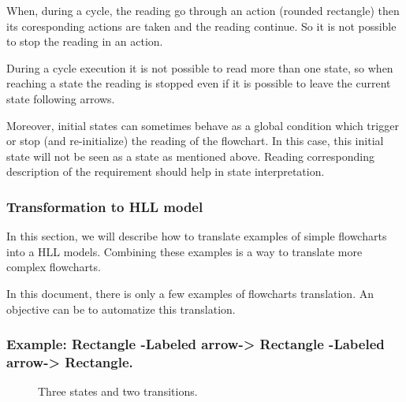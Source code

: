 When, during a cycle, the reading go through an action (rounded
rectangle) then its coresponding actions are taken and the reading
continue. So it is not possible to stop the reading in an action. 

During a cycle execution it is not possible to read more than one
state, so when reaching a state the reading is stopped even if it is
possible to leave the current state following arrows. 

Moreover, initial states can sometimes behave as a global condition
which trigger or stop (and re-initialize) the reading of the
flowchart. In this case, this initial state will not be seen as a
state as mentioned above. Reading corresponding description of the
requirement should help in state interpretation. 


\subsubsection{Transformation to HLL model}
\label{transformation-to-hll-program}
In this section, we will describe how to translate examples of simple
flowcharts into a HLL models. Combining these examples is a way to
translate more complex flowcharts.

In this document, there is only a few examples of flowcharts
translation. An objective can be to automatize this translation.


\subsubsection{Example: Rectangle -Labeled arrow-> Rectangle -Labeled arrow-> Rectangle.}
\begin{figure}[h]
\centering
{}
\caption{Three states and two transitions.}
\label{example-1}
\end{figure}


